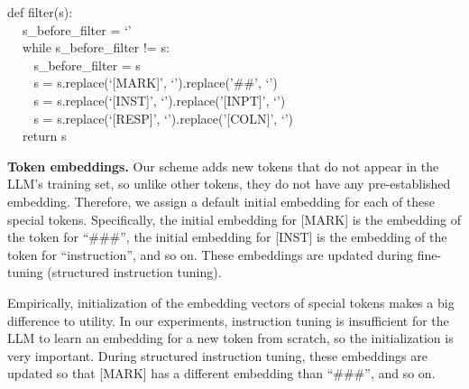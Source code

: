 \begin{tcolorbox}[colback=black!5!white,colframe=black!75!white,title=The filtering algorithm used in our secure front-end,left=0pt,right=0pt,top=0pt,bottom=0pt]
def filter(s): \\
$~~~~$ s\_before\_filter = `' \\
$~~~~$ while s\_before\_filter != s: \\
$~~~~~~~~$ s\_before\_filter = s \\
$~~~~~~~~$ s = s.replace(`[MARK]', `').replace('\#\#', `') \\ 
$~~~~~~~~$ s = s.replace(`[INST]', `').replace('[INPT]', `') \\
$~~~~~~~~$ s = s.replace(`[RESP]', `').replace('[COLN]', `') \\
$~~~~$ return s
\end{tcolorbox}


\smallskip\noindent\textbf{Token embeddings.}
Our scheme adds new tokens that do not appear in the LLM's training set,
so unlike other tokens, they do not have any pre-established embedding.
Therefore, we assign a default initial embedding for each of these special tokens.
Specifically, the initial embedding for [MARK] is the embedding of the token for ``\#\#\#'', the initial embedding for [INST] is the embedding of the token for ``instruction'', and so on.
These embeddings are updated during fine-tuning (structured instruction tuning).

Empirically, initialization of the embedding vectors of special tokens makes a big difference to utility.
In our experiments, instruction tuning is insufficient for the LLM to learn an embedding for a new token from scratch, so the initialization is very important.
During structured instruction tuning, these embeddings are updated so that [MARK] has a different embedding than ``\#\#\#'', and so on.


